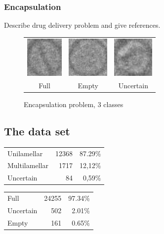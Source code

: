 \documentclass[a4paper, 11pt, table]{article}
\begin{document}
\subsubsection{Encapsulation}
Describe drug delivery problem and give references.
\begin{figure}[H]
\centering
\begin{tabular}{ccc}
	\includegraphics[height=2cm, keepaspectratio]{problem_description/packiging/full} & \includegraphics[height=2cm, keepaspectratio]{problem_description/packiging/empty} & \includegraphics[height=2cm, keepaspectratio]{problem_description/packiging/uncertain} \\
	Full & Empty & Uncertain \\[6pt]
\end{tabular}
\caption{Encapsulation problem, 3 classes}
\end{figure}

\subsection{The data set}

\begin{center}
\begin{tabular}{lrr}
\hline 
Unilamellar & 12368 & 87.29\% \\ 
Multilamellar & 1717 & 12,12\% \\ 
Uncertain & 84 & 0,59\% \\ 
\end{tabular} 
\end{center}

\begin{center}
\begin{tabular}{lrr}
\hline 
Full & 24255 & 97.34\% \\ 
Uncertain & 502 & 2.01\% \\ 
Empty & 161 & 0.65\% \\ 
\end{tabular} 
\end{center}
\end{document}
